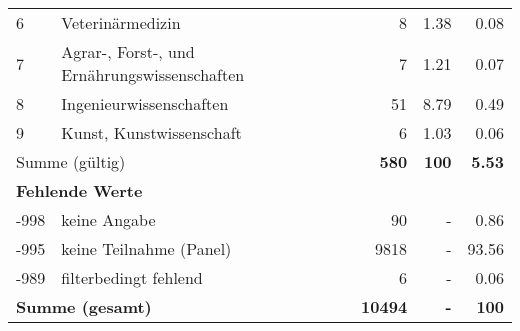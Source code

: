 \begin{longtable}{lXrrr}
     6 &
     \multicolumn{1}{X}{ Veterinärmedizin   } &


       \num{8} &
       \num[round-mode=places,round-precision=2]{1.38} &
         \num[round-mode=places,round-precision=2]{0.08} \\

     7 &
     \multicolumn{1}{X}{ Agrar-, Forst-, und Ernährungswissenschaften   } &


       \num{7} &
       \num[round-mode=places,round-precision=2]{1.21} &
         \num[round-mode=places,round-precision=2]{0.07} \\

     8 &
     \multicolumn{1}{X}{ Ingenieurwissenschaften   } &


       \num{51} &
       \num[round-mode=places,round-precision=2]{8.79} &
         \num[round-mode=places,round-precision=2]{0.49} \\

     9 &
     \multicolumn{1}{X}{ Kunst, Kunstwissenschaft   } &


       \num{6} &
       \num[round-mode=places,round-precision=2]{1.03} &
         \num[round-mode=places,round-precision=2]{0.06} \\
     \midrule
     \multicolumn{2}{l}{Summe (gültig)} &
       \textbf{\num{580}} &
     \textbf{\num{100}} &
       \textbf{\num[round-mode=places,round-precision=2]{5.53}} \\
     \multicolumn{5}{l}{\textbf{Fehlende Werte}}\\
       -998 &
       keine Angabe &
         \num{90} &
        - &
         \num[round-mode=places,round-precision=2]{0.86} \\
       -995 &
       keine Teilnahme (Panel) &
         \num{9818} &
        - &
         \num[round-mode=places,round-precision=2]{93.56} \\
       -989 &
       filterbedingt fehlend &
         \num{6} &
        - &
         \num[round-mode=places,round-precision=2]{0.06} \\
     \midrule
     \multicolumn{2}{l}{\textbf{Summe (gesamt)}} &
          \textbf{\num{10494}} &
        \textbf{-} &
        \textbf{\num{100}} \\
     \bottomrule
     \end{longtable}
     
